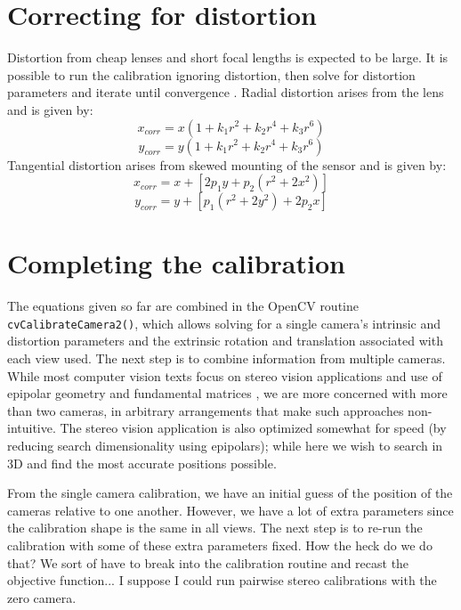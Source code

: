 \section{Correcting for distortion}
Distortion from cheap lenses and short focal lengths is expected to be large.  It is possible to run the calibration ignoring distortion, then solve for distortion parameters and iterate until convergence \cite{Bradski:2008}. Radial distortion arises from the lens and is given by:
\begin{equation}
x_{corr} = x (1+k_1 r^2 + k_2 r^4 + k_3 r^6)
\end{equation}
\begin{equation}
y_{corr} = y (1+k_1 r^2 + k_2 r^4 + k_3 r^6)
\end{equation}
Tangential distortion arises from skewed mounting of the sensor and is given by: 
\begin{equation}
x_{corr} = x + [2 p_1 y + p_2 (r^2 + 2 x^2)]
\end{equation}
\begin{equation}
y_{corr} = y + [p_1 (r^2 + 2 y^2) + 2 p_2 x]
\end{equation}

\section{Completing the calibration}
The equations given so far are combined in the OpenCV routine \texttt{cvCalibrateCamera2()}, which allows solving for a single camera's intrinsic and distortion parameters and the extrinsic rotation and translation associated with each view used.  The next step is to combine information from multiple cameras.  While most computer vision texts focus on stereo vision applications and use of epipolar geometry and fundamental matrices \cite{Bradski:2008}, we are more concerned with more than two cameras, in arbitrary arrangements that make such approaches non-intuitive.  The stereo vision application is also optimized somewhat for speed (by reducing search dimensionality using epipolars); while here we wish to search in 3D and find the most accurate positions possible. 

From the single camera calibration, we have an initial guess of the position of the cameras relative to one another.  However, we have a lot of extra parameters since the calibration shape is the same in all views.  The next step is to re-run the calibration with some of these extra parameters fixed.  How the heck do we do that? We sort of have to break into the calibration routine and recast the objective function... I suppose I could run pairwise stereo calibrations with the zero camera. 


